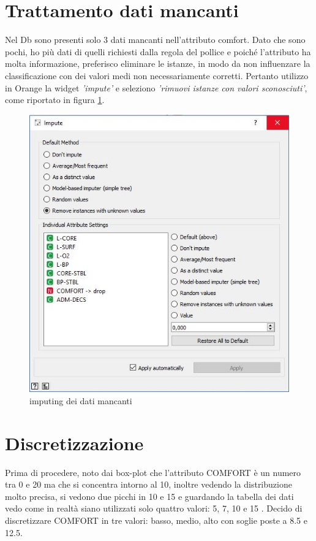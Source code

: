\documentclass[a4paper, 12p]{report}
\begin{document}
\section{Trattamento dati mancanti}
Nel Db sono presenti solo 3 dati mancanti nell'attributo comfort. Dato che sono pochi, ho più dati di quelli richiesti dalla regola del pollice e poiché l'attributo ha molta informazione, preferisco eliminare le istanze, in modo da non influenzare la classificazione con dei valori medi non necessariamente corretti.
Pertanto utilizzo in Orange la widget \emph{'impute'} e seleziono \emph{'rimuovi istanze con valori sconosciuti'}, come riportato in figura \ref{fig:3}.
\begin{figure}	
	\centering
	\includegraphics[scale = 0.45]{img/imputing.JPG}
	\caption{imputing dei dati mancanti }\label{fig:3}
\end{figure}
\section{Discretizzazione}
Prima di procedere, noto dai box-plot che l'attributo COMFORT è un numero tra 0 e 20 ma che si concentra intorno al 10, inoltre vedendo la distribuzione molto precisa, si vedono due picchi in 10 e 15 e guardando la tabella dei dati vedo come in realtà siano utilizzati solo quattro valori: 5, 7, 10 e 15 . Decido di discretizzare COMFORT in tre valori: basso, medio, alto con soglie poste a 8.5 e 12.5.
\end{document}
